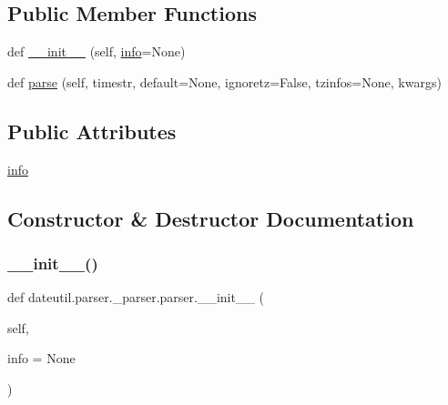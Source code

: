 \subsection*{Public Member Functions}
\begin{DoxyCompactItemize}
\item 
def \hyperlink{classdateutil_1_1parser_1_1__parser_1_1parser_ad6ff9e18dd38fb64fc1b4ad4e39a48e3}{\+\_\+\+\_\+init\+\_\+\+\_\+} (self, \hyperlink{classdateutil_1_1parser_1_1__parser_1_1parser_a27ab986de32c0d0fd240cfd1e3bc085d}{info}=None)
\item 
def \hyperlink{classdateutil_1_1parser_1_1__parser_1_1parser_a9059296e66c19d8e7ba26fe2418f50d1}{parse} (self, timestr, default=None, ignoretz=False, tzinfos=None, kwargs)
\end{DoxyCompactItemize}
\subsection*{Public Attributes}
\begin{DoxyCompactItemize}
\item 
\hyperlink{classdateutil_1_1parser_1_1__parser_1_1parser_a27ab986de32c0d0fd240cfd1e3bc085d}{info}
\end{DoxyCompactItemize}


\subsection{Constructor \& Destructor Documentation}
\mbox{\label{classdateutil_1_1parser_1_1__parser_1_1parser_ad6ff9e18dd38fb64fc1b4ad4e39a48e3}} 
\subsubsection{\texorpdfstring{\+\_\+\+\_\+init\+\_\+\+\_\+()}{\_\_init\_\_()}}
{\footnotesize\ttfamily def dateutil.\+parser.\+\_\+parser.\+parser.\+\_\+\+\_\+init\+\_\+\+\_\+ (\begin{DoxyParamCaption}\item[{}]{self,  }\item[{}]{info = {\ttfamily None} }\end{DoxyParamCaption})}



